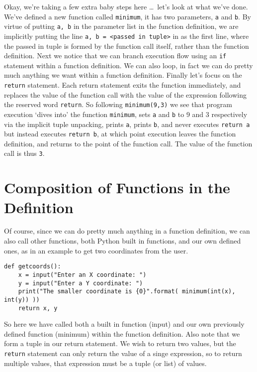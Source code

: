 Okay, we're taking a few extra baby steps here \ldots\ let's look at what   we've done. We've defined a new function called \texttt{minimum}, it has two   parameters, \texttt{a} and \texttt{b}. By virtue of putting 
\texttt{a, b} in the   parameter list in the function definition, we are implicitly putting   the line 
\texttt{a, b = <passed in tuple>} in as the first   line, where the passed in tuple is formed by the function call itself,   rather than the function definition. Next we notice that we can branch   execution flow using an \texttt{if} statement within a function definition. We   can also loop, in fact we can do pretty much anything we want within a   function definition. Finally let's focus on the \texttt{return} statement.   Each return statement exits the function immediately, and replaces the   value of the function call with the value of the expression following   the reserved word \texttt{return}. So following 
\texttt{minimum(9,3)} we   see that program execution `dives into' the function \texttt{minimum}, sets   \texttt{a} and \texttt{b} to 9 and 3 respectively via the implicit tuple unpacking,   prints \texttt{a}, prints \texttt{b}, and never executes 
\texttt{return a} but   instead executes 
\texttt{return b}, at which point execution leaves   the function definition, and returns to the   point of the function call. The value of the function call is thus   \texttt{3}.

\section{Composition of Functions in the Definition}

Of course, since we can do pretty much anything in a function   definition, we can also call other functions, both Python built in   functions, and our own defined ones, as in an example to get two   coordinates from the user.
\begin{lstlisting}
def getcoords():
    x = input("Enter an X coordinate: ")
    y = input("Enter a Y coordinate: ")
    print("The smaller coordinate is {0}".format( minimum(int(x), int(y)) ))
    return x, y
\end{lstlisting}

So here we have called both a built in function (input) and our   own previously defined function (minimum) within the function   definition. Also note that we form a tuple in our return statement. We   wish to return two values, but the \texttt{return} statement can only return   the value of a singe expression, so to return multiple values, that   expression must be a tuple (or list) of values.

